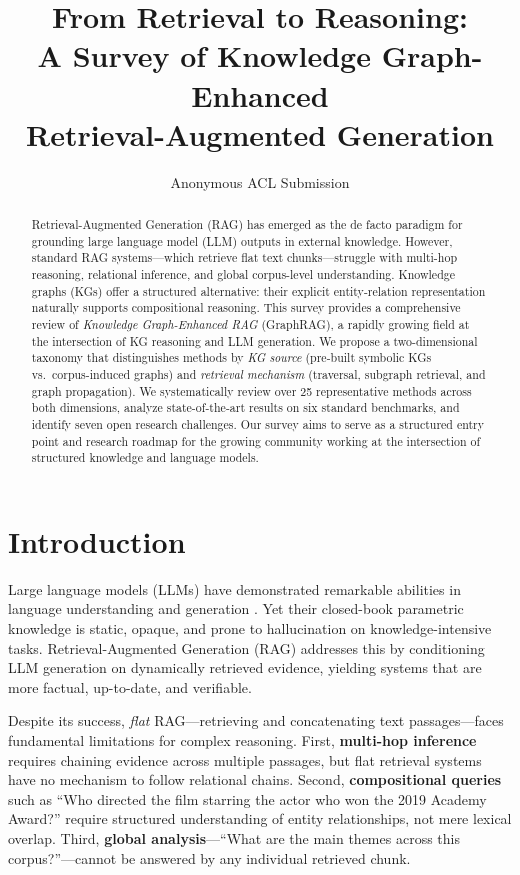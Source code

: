\documentclass[11pt]{article}
\title{From Retrieval to Reasoning:\\
A Survey of Knowledge Graph-Enhanced\\
Retrieval-Augmented Generation}
\author{
  Anonymous ACL Submission
}
\begin{document}
\maketitle

\begin{abstract}
Retrieval-Augmented Generation (RAG) has emerged as the de facto paradigm for grounding large language model (LLM) outputs in external knowledge. However, standard RAG systems—which retrieve flat text chunks—struggle with multi-hop reasoning, relational inference, and global corpus-level understanding. Knowledge graphs (KGs) offer a structured alternative: their explicit entity-relation representation naturally supports compositional reasoning. This survey provides a comprehensive review of \emph{Knowledge Graph-Enhanced RAG} (GraphRAG), a rapidly growing field at the intersection of KG reasoning and LLM generation. We propose a two-dimensional taxonomy that distinguishes methods by \emph{KG source} (pre-built symbolic KGs vs.\ corpus-induced graphs) and \emph{retrieval mechanism} (traversal, subgraph retrieval, and graph propagation). We systematically review over 25 representative methods across both dimensions, analyze state-of-the-art results on six standard benchmarks, and identify seven open research challenges. Our survey aims to serve as a structured entry point and research roadmap for the growing community working at the intersection of structured knowledge and language models.
\end{abstract}

\section{Introduction}
\label{sec:intro}

Large language models (LLMs) have demonstrated remarkable abilities in language understanding and generation \cite{lewis2020rag}. Yet their closed-book parametric knowledge is static, opaque, and prone to hallucination on knowledge-intensive tasks. Retrieval-Augmented Generation (RAG) \cite{lewis2020rag,guu2020realm} addresses this by conditioning LLM generation on dynamically retrieved evidence, yielding systems that are more factual, up-to-date, and verifiable.

Despite its success, \emph{flat} RAG—retrieving and concatenating text passages—faces fundamental limitations for complex reasoning. First, \textbf{multi-hop inference} requires chaining evidence across multiple passages, but flat retrieval systems have no mechanism to follow relational chains. Second, \textbf{compositional queries} such as ``Who directed the film starring the actor who won the 2019 Academy Award?'' require structured understanding of entity relationships, not mere lexical overlap. Third, \textbf{global analysis}—``What are the main themes across this corpus?''—cannot be answered by any individual retrieved chunk.
\end{document}
